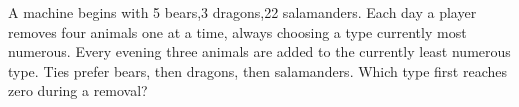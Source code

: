 A machine begins with 5 bears,3 dragons,22 salamanders. Each day a player removes four animals one at a time, always choosing a type currently most numerous. Every evening three animals are added to the currently least numerous type. Ties prefer bears, then dragons, then salamanders. Which type first reaches zero during a removal?
